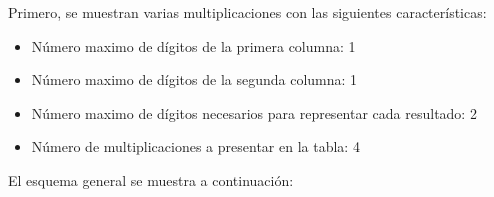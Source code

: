 \documentclass[svgnames,addpoints]{exam}
\newlength{\zerowidth}
\newlength{\zeroheight}
\begin{document}
\begin{questions}
\begin{minipage}{0.33\linewidth}
\begin{center}
\begin{tikzpicture}

      \end{tikzpicture}
    \end{center}
  \end{minipage}

  \question Primero, se muestran varias multiplicaciones con las siguientes
  características:

  \begin{itemize}

    \item Número maximo de dígitos de la primera columna: 1

    \item Número maximo de dígitos de la segunda columna: 1

    \item Número maximo de dígitos necesarios para representar cada resultado: 2

    \item Número de multiplicaciones a presentar en la tabla: 4

  \end{itemize}

  El esquema general se muestra a continuación:

  \noindent\begin{minipage}{0.33\linewidth}
    \begin{center}
\end{center}
\end{minipage}
\end{questions}
\end{document}
